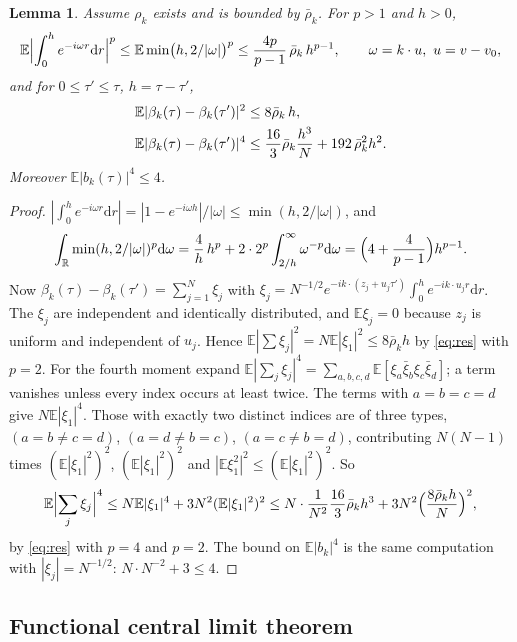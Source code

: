 \documentclass[11pt]{article}
\newcommand{\dd}{\mathrm{d}}
\newcommand{\E}{\mathbb{E}}
\newcommand{\R}{\mathbb{R}}
\newcommand{\bbar}{\bar\rho}
\newtheorem{lemma}[theorem]{Lemma}
\theoremstyle{remark}
\begin{document}
\begin{lemma}\label{lem:mom}
Assume $\rho_k$ exists and is bounded by $\bbar_k$. For $p>1$ and $h>0$,
\begin{equation}
  \E\Bigl|\int_0^he^{-i\omega r}\dd r\Bigr|^p
  \le\E\min\bigl(h,2/|\omega|\bigr)^p\le\frac{4p}{p-1}\,\bbar_k\,h^{p-1},
  \qquad\omega=k\cdot u,\ u=v-v_0 ,
  \label{eq:res}
\end{equation}
and for $0\le\tau'\le\tau$, $h=\tau-\tau'$,
\begin{align}
  \E|\beta_k(\tau)-\beta_k(\tau')|^2&\le8\bbar_k\,h,\notag\\
  \E|\beta_k(\tau)-\beta_k(\tau')|^4
  &\le\frac{16}{3}\bbar_k\frac{h^3}{N}+192\,\bbar_k^2h^2 .
  \label{eq:fourth}
\end{align}
Moreover $\E|b_k(\tau)|^4\le4$.
\end{lemma}

\begin{proof}
$|\int_0^he^{-i\omega r}\dd r|=|1-e^{-i\omega h}|/|\omega|\le\min(h,2/|\omega|)$,
and
\[
  \int_\R\min(h,2/|\omega|)^p\dd\omega
  =\frac{4}{h}\,h^p+2\cdot2^p\int_{2/h}^\infty\omega^{-p}\dd\omega
  =\Bigl(4+\frac{4}{p-1}\Bigr)h^{p-1}.
\]
Now $\beta_k(\tau)-\beta_k(\tau')=\sum_{j=1}^N\xi_j$ with
$\xi_j=N^{-1/2}e^{-ik\cdot(z_j+u_j\tau')}\int_0^he^{-ik\cdot u_jr}\dd r$.
The $\xi_j$ are independent and identically distributed, and $\E\xi_j=0$
because $z_j$ is uniform and independent of $u_j$. Hence
$\E|\sum\xi_j|^2=N\E|\xi_1|^2\le8\bbar_kh$ by \eqref{eq:res} with $p=2$.
For the fourth moment expand
$\E|\sum_j\xi_j|^4=\sum_{a,b,c,d}\E[\xi_a\bar\xi_b\xi_c\bar\xi_d]$; a term
vanishes unless every index occurs at least twice. The terms with
$a=b=c=d$ give $N\E|\xi_1|^4$. Those with exactly two distinct indices are of
three types, $(a=b\ne c=d)$, $(a=d\ne b=c)$, $(a=c\ne b=d)$, contributing
$N(N-1)$ times $(\E|\xi_1|^2)^2$, $(\E|\xi_1|^2)^2$ and
$|\E\xi_1^2|^2\le(\E|\xi_1|^2)^2$. So
\[
  \E\Bigl|\sum_j\xi_j\Bigr|^4\le N\E|\xi_1|^4+3N^2(\E|\xi_1|^2)^2
  \le N\cdot\frac{1}{N^2}\frac{16}{3}\bbar_kh^3
  +3N^2\Bigl(\frac{8\bbar_kh}{N}\Bigr)^2 ,
\]
by \eqref{eq:res} with $p=4$ and $p=2$. The bound on $\E|b_k|^4$ is the
same computation with $|\xi_j|=N^{-1/2}$: $N\cdot N^{-2}+3\le4$.
\end{proof}

\subsection{Functional central limit theorem}
\end{document}
